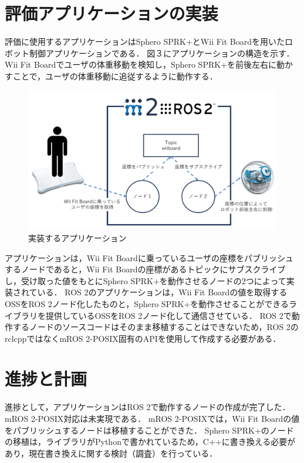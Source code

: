\documentclass[11pt]{ujarticle}
\begin{document}
\section{評価アプリケーションの実装}
評価に使用するアプリケーションはSphero SPRK+とWii Fit Boardを用いたロボット制御アプリケーションである．
図３にアプリケーションの構造を示す．
Wii Fit Boardでユーザの体重移動を検知し，Sphero SPRK+を前後左右に動かすことで，ユーザの体重移動に追従するように動作する．
\begin{figure}[t]
	\centering
	\includegraphics[width=0.7\linewidth]{./src/fig3_application_structure.png}
	\caption{実装するアプリケーション}
  \label{fig:arch}
\end{figure}
アプリケーションは，Wii Fit Boardに乗っているユーザの座標をパブリッシュするノードであると，Wii Fit Boardの座標があるトピックにサブスクライブし，受け取った値をもとにSphero SPRK+を動作させるノードの2つによって実装されている．
ROS 2のアプリケーションは，Wii Fit Boardの値を取得するOSSをROS 2ノード化したものと，Sphero SPRK+を動作させることができるライブラリを提供しているOSSをROS 2ノード化して通信させている．
ROS 2で動作するノードのソースコードはそのまま移植することはできないため，ROS 2のrclcppではなくmROS 2-POSIX固有のAPIを使用して作成する必要がある．


\section{進捗と計画}
進捗として，アプリケーションはROS 2で動作するノードの作成が完了した．
mROS 2-POSIX対応は未実現である．
mROS 2-POSIXでは，Wii Fit Boardの値をパブリッシュするノードは移植することができた．
Sphero SPRK+のノードの移植は，ライブラリがPythonで書かれているため，C++に書き換える必要があり，現在書き換えに関する検討（調査）を行っている．
\end{document}
